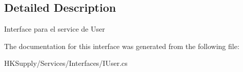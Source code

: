 \subsection{Detailed Description}
Interface para el service de User 



The documentation for this interface was generated from the following file\+:\begin{DoxyCompactItemize}
\item 
H\+K\+Supply/\+Services/\+Interfaces/I\+User.\+cs\end{DoxyCompactItemize}
